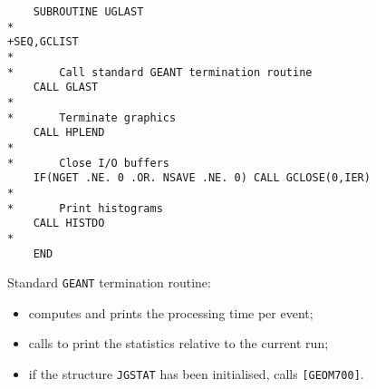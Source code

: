  
\begin{verbatim}
    SUBROUTINE UGLAST
*
+SEQ,GCLIST
*
*       Call standard GEANT termination routine
    CALL GLAST
*
*       Terminate graphics
    CALL HPLEND
*
*       Close I/O buffers
    IF(NGET .NE. 0 .OR. NSAVE .NE. 0) CALL GCLOSE(0,IER)
*
*       Print histograms
    CALL HISTDO
*
    END
\end{verbatim}
Standard {\tt GEANT} termination routine:
\begin{itemize}
\item computes and prints the processing time per event;
\item calls  to print the statistics relative to the current run;
\item if the structure {\tt JGSTAT} has been initialised, calls 
{\tt [GEOM700]}.
\end{itemize}
